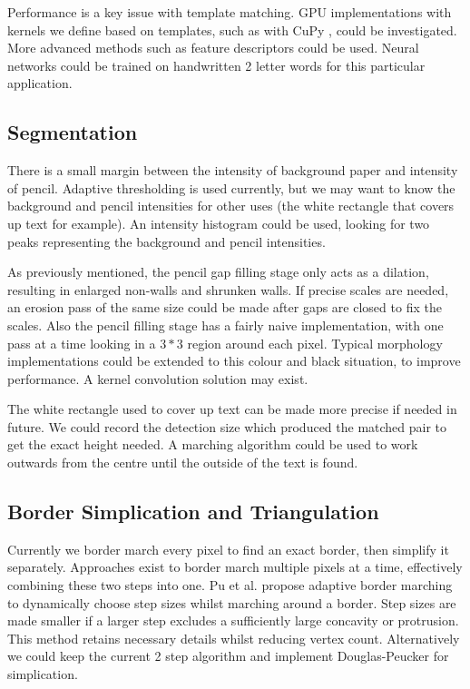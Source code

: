 \documentclass[11pt]{IEEEtran}
\begin{document}
Performance is a key issue with template matching. GPU implementations with kernels we define based on templates, such as with CuPy \cite{cupy2015user}, could be investigated. More advanced methods such as feature descriptors could be used. Neural networks could be trained on handwritten 2 letter words for this particular application.

\subsection{Segmentation}

There is a small margin between the intensity of background paper and intensity of pencil. Adaptive thresholding is used currently, but we may want to know the background and pencil intensities for other uses (the white rectangle that covers up text for example). An intensity histogram could be used, looking for two peaks representing the background and pencil intensities.

As previously mentioned, the pencil gap filling stage only acts as a dilation, resulting in enlarged non-walls and shrunken walls. If precise scales are needed, an erosion pass of the same size could be made after gaps are closed to fix the scales. Also the pencil filling stage has a fairly naive implementation, with one pass at a time looking in a $3*3$ region around each pixel. Typical morphology implementations could be extended to this colour and black situation, to improve performance. A kernel convolution solution may exist.

The white rectangle used to cover up text can be made more precise if needed in future. We could record the detection size which produced the matched pair to get the exact height needed. A marching algorithm could be used to work outwards from the centre until the outside of the text is found.

\subsection{Border Simplication and Triangulation}

Currently we border march every pixel to find an exact border, then simplify it separately. Approaches exist to border march multiple pixels at a time, effectively combining these two steps into one. Pu et al. \cite{pu2008adaptive} propose adaptive border marching to dynamically choose step sizes whilst marching around a border. Step sizes are made smaller if a larger step excludes a sufficiently large concavity or protrusion. This method retains necessary details whilst reducing vertex count. Alternatively we could keep the current 2 step algorithm and implement Douglas-Peucker \cite{douglas1973algorithms} for simplication.
\end{document}
